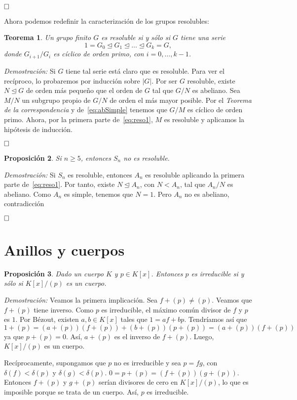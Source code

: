 \documentclass[12pt]{article}
\newtheorem{theorem}{Teorema}[section]
\newtheorem{proposition}[theorem]{Proposición}
\begin{document}
$\hfill \square$

Ahora podemos redefinir la caracterización de los grupos resolubles: 

\begin{theorem}
Un grupo finito $G$ es resoluble si y sólo si $G$ tiene una serie $$1 = G_0 \unlhd G_1 \unlhd \ldots \unlhd G_k =G,$$ donde $G_{i+1}/G_i$ es cíclico de orden primo, con $i= 0, \ldots, k-1$.
\end{theorem}
\emph{Demostración: }Si $G$ tiene tal serie está claro que es resoluble. Para ver el recíproco, lo probaremos por inducción sobre $|G|$. Por ser $G$ resoluble, existe $N \unlhd G$ de orden más pequeño que el orden de $G$ tal que $G/N$ es abeliano. Sea $M/N$ un subgrupo propio de $G/N$ de orden el más mayor posible. Por el \textit{Teorema de la correspondencia} y de~\ref{eq:abSimple} tenemos que $G/M$ es cíclico de orden primo. Ahora, por la primera parte de~\ref{eq:reso1}, $M$ es resoluble y aplicamos la hipótesis de inducción.

$\hfill \square$

\begin{proposition}Si $n\geq 5$, entonces $S_n$ no es resoluble.
\end{proposition}
\emph{Demostración: }Si $S_n$ es resoluble, entonces $A_n$ es resoluble aplicando la primera parte de~\ref{eq:reso1}. Por tanto, existe $N \unlhd A_n$, con $N < A_n$, tal que $A_n/N$ es abeliano. Como $A_n$ es simple, tenemos que $N = 1$. Pero $A_n$ no es abeliano, contradicción

$\hfill \square$


\section{Anillos y cuerpos}

\begin{proposition} Dado un cuerpo $K$ y $p \in K[x]$. Entonces $p$ es irreducible si y sólo si $K[x]/(p)$ es un cuerpo.
\end{proposition}
\emph{Demostración: }Veamos la primera implicación. Sea $f + (p) \neq (p)$. Veamos que $f + (p)$ tiene inverso. Como $p$ es irreducible, el máximo común divisor de $f$ y $p$ es $1$. Por Bézout, existen $a,b \in K[x]$ tales que $1 = af + bp$. Tendríamos así que $$1 + (p) = (a+ (p))(f+(p)) + (b+(p))(p+(p)) = (a+ (p))(f+(p))$$ ya que $p+(p)=0$. Así, $a+(p)$ es el inverso de $f+(p)$. Luego, $K[x]/(p)$ es un cuerpo.

Recíprocamente, supongamos que $p$ no es irreducible y sea $p = fg$, con $\delta(f) < \delta (p)$ y $\delta(g) < \delta (p)$. $0 =p +(p) = (f+(p))(g+(p))$. Entonces $f + (p)$ y $g +(p)$ serían divisores de cero en $K[x]/(p)$, lo que es imposible porque se trata de un cuerpo. Así, $p$ es irreducible.
\end{document}
